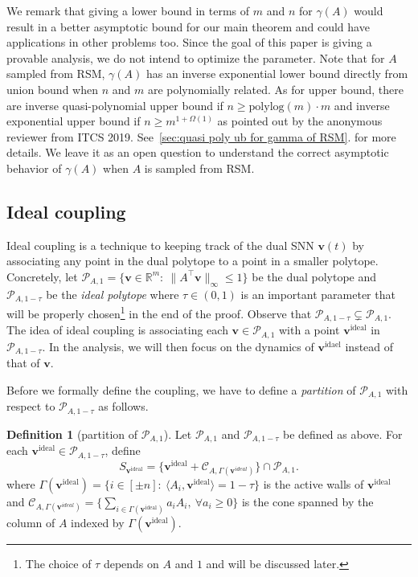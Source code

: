 \documentclass[11pt]{article}
\theoremstyle{remark}
\theoremstyle{definition}
\newtheorem{definition}{Definition}
\newcommand{\bv}{\mathbf{v}}
\newcommand{\R}{{\mathbb R}} %
\newcommand{\polylog}{{\mathrm{polylog}}}
\begin{document}
We remark that giving a lower bound in terms of $m$ and $n$ for $\gamma(A)$ would result in a better asymptotic bound for our main theorem and could have applications in other problems too. Since the goal of this paper is giving a provable analysis, we do not intend to optimize the parameter. Note that for $A$ sampled from RSM, $\gamma(A)$ has an inverse exponential lower bound directly from union bound when $n$ and $m$ are polynomially related. As for upper bound, there are inverse quasi-polynomial upper bound if $n\geq\polylog(m)\cdot m$ and inverse exponential upper bound if $n\geq m^{1+\Omega(1)}$ as pointed out by the anonymous reviewer from ITCS 2019. See~\autoref{sec:quasi poly ub for gamma of RSM}. for more details.
We leave it as an open question to understand the correct asymptotic behavior of $\gamma(A)$ when $A$ is sampled from RSM.


\subsection{Ideal coupling}\label{sec:ideal coupling}
Ideal coupling is a technique to keeping track of the dual SNN $\bv(t)$ by associating any point in the dual polytope to a point in a smaller polytope. Concretely, let $\mathcal{P}_{A,1}=\{\bv\in\R^m:\ \|A^\top\bv\|_\infty\leq1\}$ be the dual polytope and $\mathcal{P}_{A,1-\tau}$ be the \textit{ideal polytope} where $\tau\in(0,1)$ is  an important parameter that will be properly chosen\footnote{The choice of $\tau$ depends on $A$ and $1$ and will be discussed later.} in the end of the proof. Observe that $\mathcal{P}_{A,1-\tau}\subsetneq\mathcal{P}_{A,1}$. The idea of ideal coupling is associating each $\bv\in\mathcal{P}_{A,1}$ with a point $\bv^{\text{ideal}}$ in $\mathcal{P}_{A,1-\tau}$. In the analysis, we will then focus on the dynamics of $\bv^\text{idael}$ instead of that of $\bv$.

Before we formally define the coupling, we have to define a \textit{partition} of $\mathcal{P}_{A,1}$ with respect to $\mathcal{P}_{A,1-\tau}$ as follows.

\begin{definition}[partition of $\mathcal{P}_{A,1}$]\label{def:ideal partition}
	Let $\mathcal{P}_{A,1}$ and $\mathcal{P}_{A,1-\tau}$ be defined as above. For each $\bv^\text{ideal}\in\mathcal{P}_{A,1-\tau}$, define
	\begin{equation*}
	S_{\bv^\text{ideal}} = \{\bv^\text{ideal}+\mathcal{C}_{A,\Gamma(\bv^{ideal})}\}\cap\mathcal{P}_{A,1}.
	\end{equation*}
	where $\Gamma(\bv^\text{ideal})=\{i\in[\pm n]:\ \langle A_i,\bv^\text{ideal}\rangle=1-\tau\}$ is the active walls of $\bv^\text{ideal}$ and $\mathcal{C}_{A,\Gamma(\bv^{ideal})}=\{\sum_{i\in\Gamma(\bv^\text{ideal})}a_iA_i,\ \forall a_i\geq0\}$ is the cone spanned by the column of $A$ indexed by $\Gamma(\bv^\text{ideal})$.
\end{definition}
\end{document}
